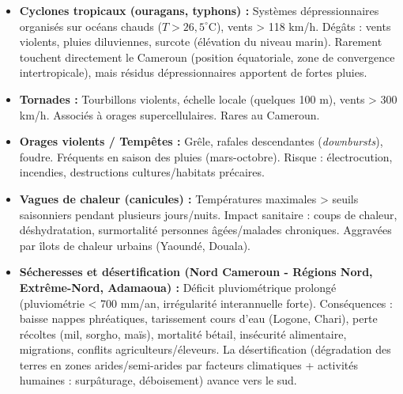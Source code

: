 \documentclass[11pt]{article}
\newcommand{\cle}[1]{{\popxbold\color{popdark}#1}}
\begin{document}
\begin{itemize}
    \item \textbf{Cyclones tropicaux (ouragans, typhons) :} Systèmes dépressionnaires organisés sur océans chauds ($T > 26,5^\circ$C), vents > 118 km/h. Dégâts : vents violents, pluies diluviennes, \cle{surcote} (élévation du niveau marin). Rarement touchent directement le Cameroun (position équatoriale, zone de convergence intertropicale), mais résidus dépressionnaires apportent de fortes pluies.
    \item \textbf{Tornades :} Tourbillons violents, échelle locale (quelques 100 m), vents > 300 km/h. Associés à orages supercellulaires. Rares au Cameroun.
    \item \textbf{Orages violents / Tempêtes :} Grêle, rafales descendantes (\emph{downbursts}), foudre. Fréquents en saison des pluies (mars-octobre). Risque : électrocution, incendies, destructions cultures/habitats précaires.
    \item \textbf{Vagues de chaleur (canicules) :} Températures maximales > seuils saisonniers pendant plusieurs jours/nuits. Impact sanitaire : coups de chaleur, déshydratation, surmortalité personnes âgées/malades chroniques. Aggravées par îlots de chaleur urbains (Yaoundé, Douala).
    \item \textbf{Sécheresses et désertification (Nord Cameroun - Régions Nord, Extrême-Nord, Adamaoua) :} Déficit pluviométrique prolongé (pluviométrie < 700 mm/an, irrégularité interannuelle forte). Conséquences : baisse nappes phréatiques, tarissement cours d'eau (Logone, Chari), perte récoltes (mil, sorgho, maïs), mortalité bétail, insécurité alimentaire, migrations, conflits agriculteurs/éleveurs. La \cle{désertification} (dégradation des terres en zones arides/semi-arides par facteurs climatiques + activités humaines : surpâturage, déboisement) avance vers le sud.
\end{itemize}
\end{document}
